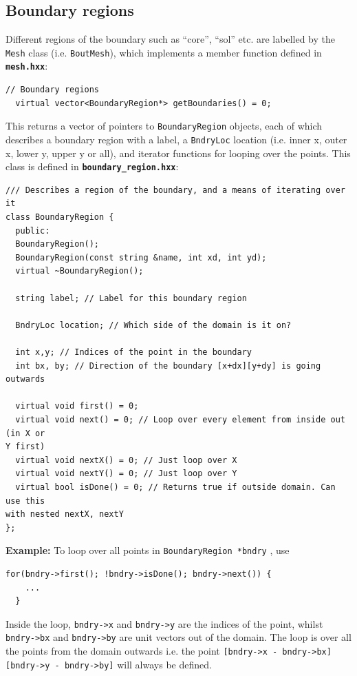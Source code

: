 \documentclass[12pt]{article}
\newcommand{\code}[1]{\texttt{#1}}
\newcommand{\file}[1]{\texttt{\bf #1}}
\begin{document}
\subsection{Boundary regions}
%
\label{sec:BoundaryRegion}
%
Different regions of the boundary such as ``core'', ``sol'' etc. are labelled
by the \code{Mesh} class (i.e. \code{BoutMesh}), which implements a member
function defined in \file{mesh.hxx}:
%
\begin{lstlisting}[firstnumber=150]
  // Boundary regions
  virtual vector<BoundaryRegion*> getBoundaries() = 0;
\end{lstlisting}
%
This returns a vector of pointers to \code{BoundaryRegion} objects, each of
which describes a boundary region with a label, a \code{BndryLoc} location
(i.e. inner x, outer x, lower y, upper y or all), and iterator functions for
looping over the points. This class is defined in \file{boundary\_region.hxx}:
%
%
\begin{lstlisting}[firstnumber=12]
/// Describes a region of the boundary, and a means of iterating over it
class BoundaryRegion {
  public:
  BoundaryRegion();
  BoundaryRegion(const string &name, int xd, int yd);
  virtual ~BoundaryRegion();

  string label; // Label for this boundary region

  BndryLoc location; // Which side of the domain is it on?

  int x,y; // Indices of the point in the boundary
  int bx, by; // Direction of the boundary [x+dx][y+dy] is going outwards

  virtual void first() = 0;
  virtual void next() = 0; // Loop over every element from inside out (in X or
Y first)
  virtual void nextX() = 0; // Just loop over X
  virtual void nextY() = 0; // Just loop over Y
  virtual bool isDone() = 0; // Returns true if outside domain. Can use this
with nested nextX, nextY
};
\end{lstlisting}
%
{\bf Example:} To loop over all points in \code{BoundaryRegion *bndry} , use
%
\begin{lstlisting}[numbers=none]
  for(bndry->first(); !bndry->isDone(); bndry->next()) {
    ...
  }
\end{lstlisting}
%
Inside the loop, \code{bndry->x} and \code{bndry->y} are the indices of the
point, whilst \code{bndry->bx} and \code{bndry->by} are unit vectors out of the
domain. The loop is over all the points from the domain outwards i.e. the point
\code{[bndry->x - bndry->bx][bndry->y - bndry->by]} will always be defined.
\end{document}
